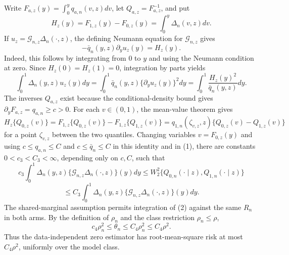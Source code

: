 Write \(F_{a,z}(y)=\int_0^yq_{a,n}(v,z)dv\), let \(Q_{a,z}=F_{a,z}^{-1}\), and put
\[
H_z(y)=F_{1,z}(y)-F_{0,z}(y)=\int_0^y\Delta_n(v,z)dv.
\]
If \(u_z=\mathcal G_{n,z}\Delta_n(\cdot,z)\), the defining Neumann equation for \(\mathcal G_{n,z}\) gives
\[
-\bar q_n(y,z)\partial_yu_z(y)=H_z(y).
\]
Indeed, this follows by integrating from \(0\) to \(y\) and using the Neumann condition at zero.  Since \(H_z(0)=H_z(1)=0\), integration by parts yields
\[
\int_0^1\Delta_n(y,z)u_z(y)dy
=\int_0^1\bar q_n(y,z)\{\partial_yu_z(y)\}^2dy
=\int_0^1\frac{H_z(y)^2}{\bar q_n(y,z)}dy. \tag{1}
\]
The inverses \(Q_{a,z}\) exist because the conditional-density bound gives \(\partial_yF_{a,z}=q_{a,n}\ge c>0\).  For each \(v\in(0,1)\), the mean-value theorem gives
\[
H_z\{Q_{0,z}(v)\}
=F_{1,z}\{Q_{0,z}(v)\}-F_{1,z}\{Q_{1,z}(v)\}
=q_{1,n}(\zeta_{v,z},z)\{Q_{0,z}(v)-Q_{1,z}(v)\}
\]
for a point \(\zeta_{v,z}\) between the two quantiles.  Changing variables \(v=F_{0,z}(y)\) and using \(c\le q_{a,n}\le C\) and \(c\le\bar q_n\le C\) in this identity and in (1), there are constants \(0<c_3<C_3<\infty\), depending only on \(c,C\), such that
\[
c_3\int_0^1\Delta_n(y,z)\{\mathcal G_{n,z}\Delta_n(\cdot,z)\}(y)dy
\le W_2^2\{Q_{0,n}(\cdot\mid z),Q_{1,n}(\cdot\mid z)\}
\]
\[
\le C_3\int_0^1\Delta_n(y,z)\{\mathcal G_{n,z}\Delta_n(\cdot,z)\}(y)dy. \tag{2}
\]
The shared-marginal assumption permits integration of (2) against the same \(R_n\) in both arms.  By the definition of \(\rho_n\) and the class restriction \(\rho_n\le\rho\),
\[
c_4\rho_n^2\le\theta_n\le C_4\rho_n^2\le C_4\rho^2. \tag{3}
\]
Thus the data-independent zero estimator has root-mean-square risk at most \(C_4\rho^2\), uniformly over the model class.

